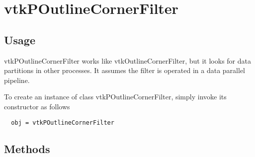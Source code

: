 \section{vtkPOutlineCornerFilter}

\subsection{Usage}

 vtkPOutlineCornerFilter works like vtkOutlineCornerFilter, 
 but it looks for data
 partitions in other processes.  It assumes the filter is operated
 in a data parallel pipeline.

To create an instance of class vtkPOutlineCornerFilter, simply
invoke its constructor as follows
\begin{verbatim}
  obj = vtkPOutlineCornerFilter
\end{verbatim}
\subsection{Methods}

